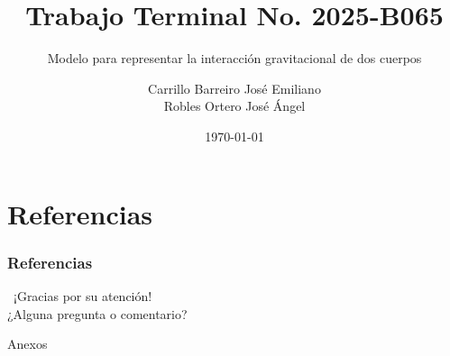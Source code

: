 \documentclass[spanish]{beamer}
\author[Carrillo B. José E. \&  Robles O. José A.]{Carrillo Barreiro José Emiliano \\ Robles Ortero José Ángel}
\title{Trabajo Terminal No. 2025-B065}
\subtitle{Modelo para representar la interacción gravitacional de dos cuerpos}
\institute{Instituto Politécnico Nacional \\ Escuela Superior de Cómputo}
\date{\today}
\begin{document}
    \begin{frame}
        \titlepage%
    \end{frame}

    
    
    
    
    
    
    

    \section{Referencias}

    \begin{frame}[allowframebreaks]
        \frametitle{Referencias}
        \begingroup
        \fontsize{6pt}{7pt}\selectfont
        \printbibliography[heading=none]
        \endgroup
    \end{frame}

    \begin{frame}
        \begin{center}
            {\Huge\calligra~¡Gracias por su atención!}\\
            ¿Alguna pregunta o comentario?
        \end{center}
    \end{frame}

    \appendix
    \makeatletter
    \renewcommand{\thesection}{\Alph{section}}
    \makeatother
    \setcounter{section}{0}

    \begin{frame}
        \begingroup
            \begin{center}
                {\Huge Anexos}
            \end{center}
        \endgroup
    \end{frame}
    
    
    
    
\end{document}
